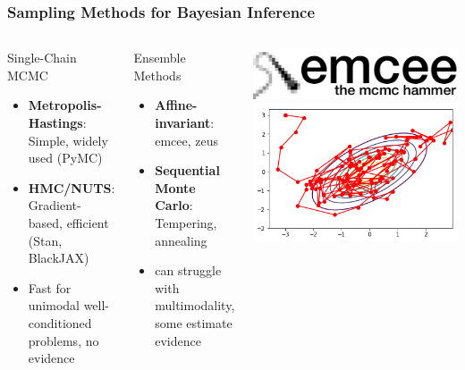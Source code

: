 \documentclass[aspectratio=169]{beamer}
\begin{document}
\begin{frame}
    \frametitle{Sampling Methods for Bayesian Inference}
    \begin{columns}
        \begin{block}{Single-Chain MCMC}
            \begin{itemize}
                \item \textbf{Metropolis-Hastings}: Simple, widely used (PyMC)
                \item \textbf{HMC/NUTS}: Gradient-based, efficient (Stan, BlackJAX)
                \item Fast for unimodal well-conditioned problems, no evidence
            \end{itemize}
        \end{block}
        \begin{block}{Ensemble Methods}
            \begin{itemize}
                \item \textbf{Affine-invariant}: emcee, zeus
                \item \textbf{Sequential Monte Carlo}: Tempering, annealing
                \item can struggle with multimodality, some estimate evidence
            \end{itemize}
        \end{block}
        \begin{columns}
        \includegraphics[width=\textwidth]{figures/emcee}
        \includegraphics[width=\textwidth]{figures/metropolis-hastings}

\end{columns}
\end{columns}
\end{frame}
\end{document}
